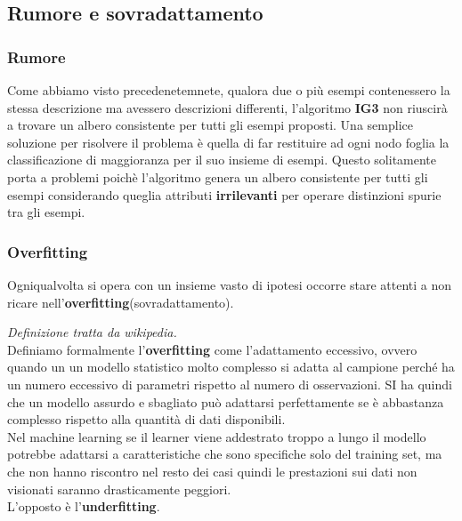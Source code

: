 \subsection{Rumore e sovradattamento}
\subsubsection{Rumore}
Come abbiamo visto precedenetemnete, qualora due o più esempi contenessero la stessa descrizione ma avessero descrizioni differenti, l'algoritmo \textbf{IG3} non riuscirà a trovare un albero consistente per tutti gli esempi proposti. Una semplice soluzione per risolvere il problema è quella di far restituire ad ogni nodo foglia la classificazione di maggioranza per il suo insieme di esempi. Questo solitamente porta a problemi poichè l'algoritmo genera un albero consistente per tutti gli esempi considerando queglia attributi \textbf{irrilevanti} per operare distinzioni spurie tra gli esempi. 
\subsubsection{Overfitting}
Ogniqualvolta si opera con un insieme vasto di ipotesi occorre stare attenti a non ricare nell'\textbf{overfitting}(sovradattamento).
\begin{definizione}
  \textit{Definizione tratta da wikipedia.}\\
  Definiamo formalmente l'\textbf{overfitting} come l'adattamento eccessivo,
  ovvero quando 
  un un modello statistico molto complesso si adatta al campione perché ha un
  numero eccessivo di parametri rispetto al numero di osservazioni. SI ha
  quindi che un modello assurdo e sbagliato può adattarsi perfettamente se è
  abbastanza complesso rispetto alla quantità di dati disponibili.\\
  Nel machine learning se il learner viene addestrato troppo a lungo il modello
  potrebbe adattarsi a caratteristiche che sono specifiche solo del training
  set, ma che non hanno riscontro nel resto dei casi quindi le prestazioni sui
  dati non visionati saranno drasticamente peggiori.\\
  L'opposto è l'\textbf{underfitting}.
\end{definizione}

